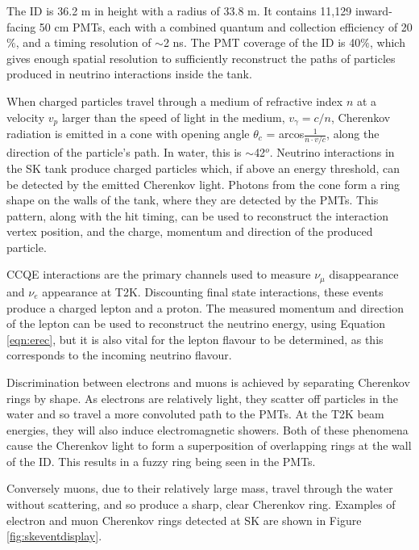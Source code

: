 The ID is 36.2 m in height with a radius of 33.8 m. It contains 11,129 inward-facing 50 cm PMTs, each with a combined quantum and collection efficiency of 20$\%$, and a timing resolution of $\sim$2 ns. The PMT coverage of the ID is 40$\%$, which gives enough spatial resolution to sufficiently reconstruct the paths of particles produced in neutrino interactions inside the tank.

When charged particles travel through a medium of refractive index $n$ at a velocity $v_p$ larger than the speed of light in the medium, $v_\gamma = c/n$, Cherenkov radiation is emitted in a cone with opening angle $\theta_c$ = arcos$\frac{1}{n\cdot v/c}$, along the direction of the particle's path. In water, this is $\sim$42$^o$. Neutrino interactions in the SK tank produce charged particles which, if above an energy threshold, can be detected by the emitted Cherenkov light. Photons from the cone form a ring shape on the walls of the tank, where they are detected by the PMTs. This pattern, along with the hit timing, can be used to reconstruct the interaction vertex position, and the charge, momentum and direction of the produced particle.

CCQE interactions are the primary channels used to measure $\nu_\mu$ disappearance and $\nu_e$ appearance at T2K. Discounting final state interactions, these events produce a charged lepton and a proton. The measured momentum and direction of the lepton can be used to reconstruct the neutrino energy, using Equation \ref{eqn:erec}, but it is also vital for the lepton flavour to be determined, as this corresponds to the incoming neutrino flavour.

Discrimination between electrons and muons is achieved by separating Cherenkov rings by shape. As electrons are relatively light, they scatter off particles in the water and so travel a more convoluted path to the PMTs. At the T2K beam energies, they will also induce electromagnetic showers. Both of these phenomena cause the Cherenkov light to form a superposition of overlapping rings at the wall of the ID. This results in a fuzzy ring being seen in the PMTs.

Conversely muons, due to their relatively large mass, travel through the water without scattering, and so produce a sharp, clear Cherenkov ring. Examples of electron and muon Cherenkov rings detected at SK are shown in Figure \ref{fig:skeventdisplay}.

